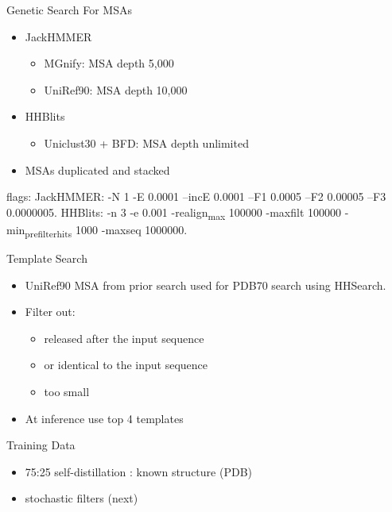 \documentclass[presentation, smaller]{beamer}
\begin{document}
\begin{frame}[label={sec:org4ee7e1b}]{Genetic Search \cite{jumperHighlyAccurateProtein2021}}
For MSAs
\begin{itemize}
\item JackHMMER
\begin{itemize}
\item MGnify: MSA depth 5,000
\item UniRef90: MSA depth 10,000
\end{itemize}
\item HHBlits
\begin{itemize}
\item Uniclust30 + BFD: MSA depth unlimited
\end{itemize}
\item MSAs duplicated and stacked
\end{itemize}

flags:
  JackHMMER: -N 1 -E 0.0001 --incE 0.0001 --F1 0.0005 --F2 0.00005 --F3 0.0000005.
  HHBlits: -n 3 -e 0.001 -realign\textsubscript{max} 100000 -maxfilt 100000 -min\textsubscript{prefilter}\textsubscript{hits} 1000 -maxseq 1000000.
\end{frame}

\begin{frame}[label={sec:orgba511fa}]{Template Search \cite{jumperHighlyAccurateProtein2021}}
\begin{itemize}
\item UniRef90 MSA from prior search used for PDB70 search using HHSearch.
\item Filter out:
\begin{itemize}
\item released after the input sequence
\item or identical to the input sequence
\item too small
\end{itemize}
\item At inference use top 4 templates
\end{itemize}
\end{frame}

\begin{frame}[label={sec:orgd22cd9e}]{Training Data \cite{jumperHighlyAccurateProtein2021}}
\begin{itemize}
\item 75:25 self-distillation : known structure (PDB)
\item stochastic filters (next)
\end{itemize}
\end{frame}
\end{document}
